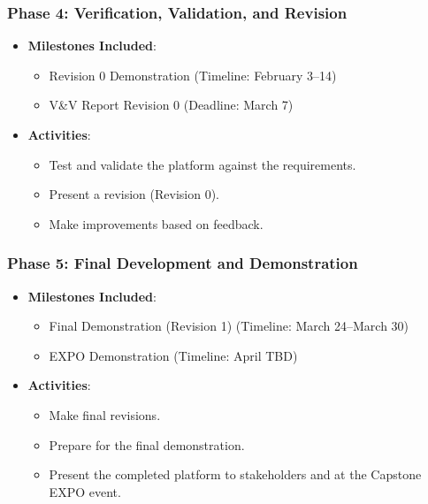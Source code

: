\documentclass[12pt]{article}
\begin{document}
\subsubsection*{Phase 4: Verification, Validation, and Revision}
\begin{itemize}
    \item \textbf{Milestones Included}:
    \begin{itemize}
        \item Revision 0 Demonstration (Timeline: February 3–14)
        \item V\&V Report Revision 0 (Deadline: March 7)
    \end{itemize}
    \item \textbf{Activities}:
    \begin{itemize}
        \item Test and validate the platform against the requirements.
        \item Present a revision (Revision 0).
        \item Make improvements based on feedback.
    \end{itemize}
\end{itemize}

\subsubsection*{Phase 5: Final Development and Demonstration}
\begin{itemize}
    \item \textbf{Milestones Included}:
    \begin{itemize}
        \item Final Demonstration (Revision 1) (Timeline: March 24–March 30)
        \item EXPO Demonstration (Timeline: April TBD)
    \end{itemize}
    \item \textbf{Activities}:
    \begin{itemize}
        \item Make final revisions.
        \item Prepare for the final demonstration.
        \item Present the completed platform to stakeholders and at the Capstone EXPO event.
    \end{itemize}
\end{itemize}
\end{document}
